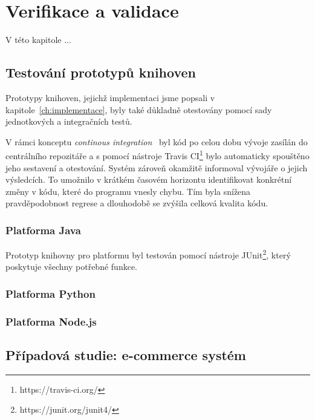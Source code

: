 \usepackage[T1]{fontenc}
\usepackage[utf8]{inputenc}


\chapter{Verifikace a validace}\label{ch:verifikace}

V této kapitole ... %

\section{Testování prototypů knihoven}

Prototypy knihoven, jejichž implementaci jsme popsali
v kapitole~\ref{ch:implementace}, byly také důkladně
otestovány pomocí sady jednotkových a integračních testů.

V rámci konceptu \textit{continous integration}~\cite{fowler2006continuous}
byl kód po celou dobu vývoje zasílán do centrálního repozitáře
a s pomocí nástroje Travis CI\footnote{https://travis-ci.org/}
bylo automaticky spouštěno jeho sestavení a otestování. Systém
zároveň okamžitě informoval vývojáře o jejich výsledcích. To
umožnilo v krátkém časovém horizontu identifikovat konkrétní změny
v kódu, které do programu vnesly chybu. Tím byla snížena
pravděpodobnost regrese a dlouhodobě se zvýšila celková kvalita kódu.

\subsection{Platforma Java}

Prototyp knihovny pro platformu byl testován pomocí
nástroje JUnit\footnote{https://junit.org/junit4/},
který poskytuje všechny potřebné funkce.

\subsection{Platforma Python}

\subsection{Platforma Node.js}

\section{Případová studie: e-commerce systém}

